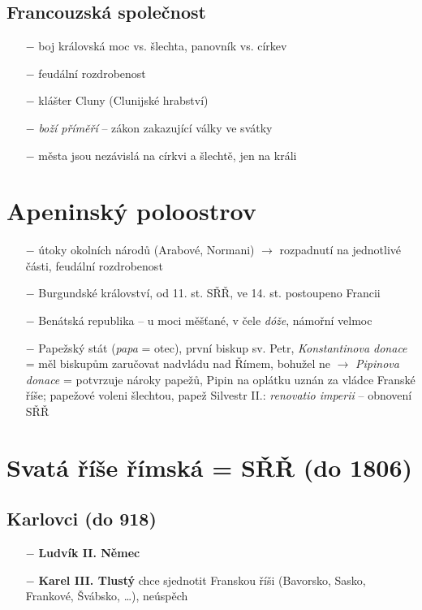 \documentclass{article}
\begin{document}
\subsection*{Francouzská společnost}
\begin{itemize}
    \vspace{-0.5em}
    \setlength\itemsep{0.15em}
    \item[$-$] boj královská moc vs. šlechta, panovník vs. církev
    \item[$-$] feudální rozdrobenost
    \item[$-$] klášter Cluny (Clunijské hrabství)
    \item[$-$] \textit{boží příměří} -- zákon zakazující války ve svátky
    \item[$-$] města jsou nezávislá na církvi a šlechtě, jen na králi
\end{itemize}

\section*{Apeninský poloostrov}
\begin{itemize}
    \vspace{-0.5em}
    \setlength\itemsep{0.15em}
    \item[$-$] útoky okolních národů (Arabové, Normani) $\rightarrow$ rozpadnutí na jednotlivé části, feudální rozdrobenost
    \item[$-$] Burgundské království, od 11. st. SŘŘ, ve 14. st. postoupeno Francii
    \item[$-$] Benátská republika -- u moci měšťané, v čele \textit{dóže}, námořní velmoc
    \item[$-$] Papežský stát (\textit{papa} = otec), první biskup sv. Petr, \textit{Konstantinova donace} = měl biskupům zaručovat nadvládu nad Římem, bohužel ne $\rightarrow$ \textit{Pipinova donace} = potvrzuje nároky papežů, Pipin na oplátku uznán za vládce Franské říše; papežové voleni šlechtou, papež Silvestr II.: \textit{renovatio imperii} -- obnovení SŘŘ
\end{itemize}

\section*{Svatá říše římská = SŘŘ (do 1806)}
\subsection*{Karlovci (do 918)}
\begin{itemize}
    \vspace{-0.5em}
    \setlength\itemsep{0.15em}
    \item[$-$] \textbf{Ludvík II. Němec}
    \item[$-$] \textbf{Karel III. Tlustý} chce sjednotit Franskou říši (Bavorsko, Sasko, Frankové, Švábsko, \dots), neúspěch
\end{itemize}
\end{document}
